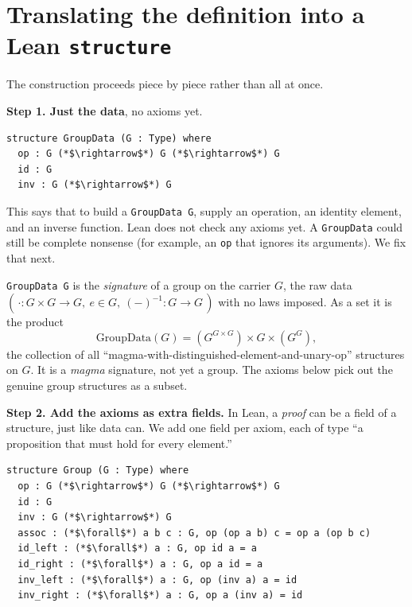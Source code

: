 \section{\texorpdfstring{Translating the definition into a Lean \texttt{structure}}{Translating the definition into a Lean structure}}\label{sec:06-groups:02-translating:1}

The construction proceeds piece by piece rather than all at once.

\textbf{Step 1. Just the data}, no axioms yet.

\begin{lstlisting}
structure GroupData (G : Type) where
  op : G (*$\rightarrow$*) G (*$\rightarrow$*) G
  id : G
  inv : G (*$\rightarrow$*) G
\end{lstlisting}

This says that to build a \texttt{GroupData G}, supply an operation, an identity element, and an inverse function. Lean does not check any axioms yet. A \texttt{GroupData} could still be complete nonsense (for example, an \texttt{op} that ignores its arguments). We fix that next.

\begin{mathreading}

\texttt{GroupData G} is the \emph{signature} of a group on the carrier \(G\), the raw data \((\,\cdot : G\times G \to G,\ e \in G,\ (-)^{-1} : G \to G\,)\) with no laws imposed. As a set it is the product \[
\mathrm{GroupData}(G) = (G^{G\times G}) \times G \times (G^{G}),
\] the collection of all ``magma-with-distinguished-element-and-unary-op'' structures on \(G\). It is a \emph{magma} signature, not yet a group. The axioms below pick out the genuine group structures as a subset.

\end{mathreading}

\textbf{Step 2. Add the axioms as extra fields.} In Lean, a \emph{proof} can be a field of a structure, just like data can. We add one field per axiom, each of type ``a proposition that must hold for every element.''

\begin{lstlisting}
structure Group (G : Type) where
  op : G (*$\rightarrow$*) G (*$\rightarrow$*) G
  id : G
  inv : G (*$\rightarrow$*) G
  assoc : (*$\forall$*) a b c : G, op (op a b) c = op a (op b c)
  id_left : (*$\forall$*) a : G, op id a = a
  id_right : (*$\forall$*) a : G, op a id = a
  inv_left : (*$\forall$*) a : G, op (inv a) a = id
  inv_right : (*$\forall$*) a : G, op a (inv a) = id
\end{lstlisting}

